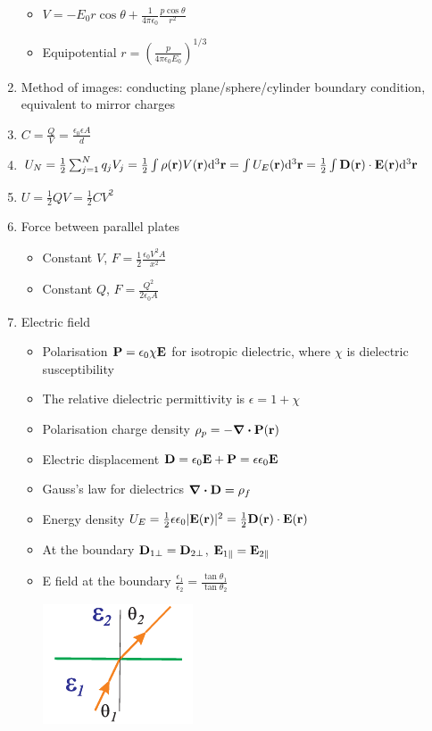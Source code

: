 \documentclass{article}
\theoremstyle{remark}
\theoremstyle{remark}
\begin{document}
\begin{enumerate}
\begin{itemize}
        \item $V = -E_0 r\cos\theta + \frac{1}{4\pi\epsilon_0}\frac{p\cos\theta}{r^2} $
        \item Equipotential $r = \left(\frac{p}{4\pi\epsilon_0 E_0}\right)^{1/3} $
    \end{itemize}
    \item Method of images: conducting plane/sphere/cylinder boundary condition, equivalent to mirror charges
    \item $C = \frac{Q}{V} = \frac{\epsilon_0\epsilon A}{d} $
    \item $U_N = \frac{1}{2}\sum_{j=1}^{N}q_j V_j = \frac{1}{2}\int\rho(\vb{r})V(\vb{r})\dd^3\vb{r} = \int U_E(\vb{r})\dd^3\vb{r} = \frac{1}{2}\int\vb{D}(\vb{r})\cdot\vb{E}(\vb{r})\dd^3\vb{r} $
    \item $U=\frac{1}{2}QV = \frac{1}{2}CV^2 $
    \item Force between parallel plates\begin{itemize}
        \item Constant $V$, $F = \frac{1}{2}\frac{\epsilon_0 V^2 A}{x^2} $
        \item Constant $Q$, $F = \frac{Q^2}{2\epsilon_0 A} $
    \end{itemize}
    \item Electric field\begin{itemize}
        \item Polarisation $\vb{P}=\epsilon_0\chi\vb{E}$ for isotropic dielectric, where $\chi$ is dielectric susceptibility
        \item The relative dielectric permittivity is $\epsilon=1+\chi$
        \item Polarisation charge density $\rho_p = -\div\vb{P}(\vb{r}) $
        \item Electric displacement $\vb{D} = \epsilon_0\vb{E}+\vb{P} = \epsilon\epsilon_0\vb{E} $
        \item Gauss's law for dielectrics $\div\vb{D} = \rho_f $
        \item Energy density $U_E = \frac{1}{2}\epsilon\epsilon_0|\vb{E}(\vb{r})|^2 = \frac{1}{2}\vb{D}(\vb{r})\cdot\vb{E}(\vb{r}) $
        \item At the boundary $\vb{D}_{1\perp} = \vb{D}_{2\perp} $, $\vb{E}_{1\parallel} = \vb{E}_{2\parallel} $
        \item E field at the boundary $\frac{\epsilon_1}{\epsilon_2} = \frac{\tan\theta_1}{\tan\theta_2} $
            \begin{center}
                \includegraphics*[width=0.3\linewidth]{boundary_E_field.png}

\end{center}
\end{itemize}
\end{enumerate}
\end{document}
